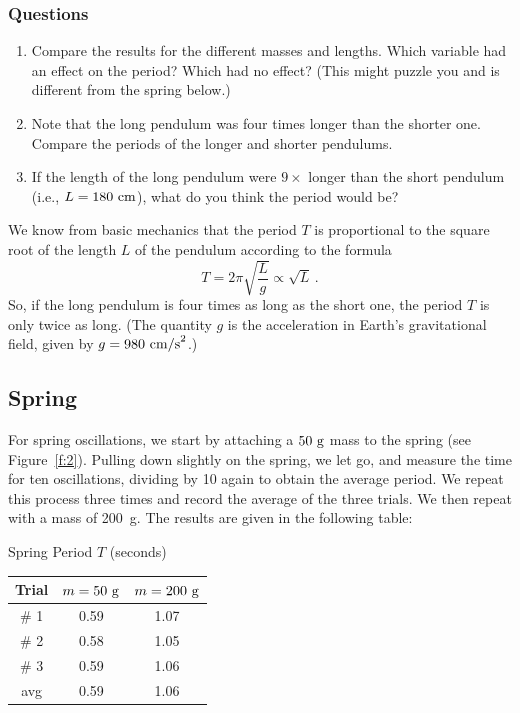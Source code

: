 \documentclass[11pt]{NSF}
\def\be{\begin{equation}}
\def\ee{\end{equation}}
\def\ben{\begin{enumerate}}
\def\een{\end{enumerate}}
\def\i{\item{}}
\begin{document}
\subsubsection*{Questions}
%
\ben
\i Compare the results for the different masses and lengths. 
Which variable had an effect on the period? Which had no effect? 
(This might puzzle you and is different from the spring below.)

\i Note that the long pendulum was four times longer than the shorter one. 
Compare the periods of the longer and shorter pendulums.

\i If the length of the long pendulum were $9\times$ longer 
than the short pendulum (i.e., $L=180~{\rm cm}$), what do you think
the period would be?
\een

We know from basic mechanics that the period $T$ is proportional 
to the square root of the length $L$ of the pendulum according to the formula
\be
T=2\pi\sqrt{\frac{L}{g}}\propto \sqrt{L}\,.
\ee
So, if the long pendulum is four times as long as the short one, 
the period $T$ is only twice as long. 
(The quantity $g$ is the acceleration in Earth’s gravitational field, 
given by $g = 980~{\rm cm/s}^2$.)

\subsection{Spring}

For spring oscillations, we start by attaching a 
$50~{\rm g}$ mass to the spring (see Figure~\ref{f:2}).
Pulling down slightly on the spring, we let go, and measure the time for ten 
oscillations, dividing by 10 again to obtain the average period.
We repeat this process three times and record the average of the three trials.
We then repeat with a mass of 200~g.
The results are given in the following table:
%
\begin{table}[hbtp]
\begin{center}
Spring Period $T$ (seconds)\\
\begin{tabular}{| c | c | c | }
\hline
Trial & $m=50~{\rm g}$ & $m=200~{\rm g}$ \\
\hline
\# 1 & 0.59 & 1.07 \\
\hline
\# 2 & 0.58 & 1.05  \\
\hline
\# 3 & 0.59 & 1.06 \\
\hline
avg  & 0.59 & 1.06 \\
\hline
\end{tabular}
\label{t:2}
\end{center}
\end{table}
%
\end{document}
